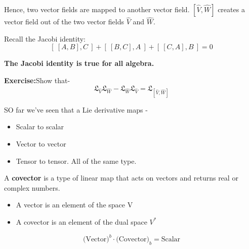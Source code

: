 \documentclass[14pt]{article} %
\begin{document}
Hence, two vector fields are mapped to another vector field. 
$[ \hat{V}, \hat{W}]$ creates a vector field out of the two vector fields $\hat{V}$ and $\hat{W}$.
\begin{tcolorbox}[proofbox, title=Note:]
Recall the Jacobi identity:
\[
\left[~ [ A, B], C~ \right] + \left[ ~[ B, C], A~ \right] + \left[~[ C, A ], B~ \right] = 0
\]
\begin{center}
    \textbf{The Jacobi identity is true for all algebra.}
\end{center}
\end{tcolorbox}
\begin{framed}
\noindent
\textbf{Exercise:}\quad Show that-
\[
\mathfrak{L}_{\hat{V}} \mathfrak{L}_{\hat{W}} - \mathfrak{L}_{\hat{W}} \mathfrak{L}_{\hat{V}} = \mathfrak{L}_{[\hat{V},\hat{W}]}
\]
\end{framed}
SO far we've seen that a Lie derivative maps -
\begin{itemize}
    \item Scalar to scalar
    \item Vector to vector
    \item Tensor to tensor. All of the same type.
\end{itemize}
\begin{tcolorbox}[proofbox, title=Covector]
A \textbf{covector} is a type of linear map that acts on vectors and returns real or complex numbers.
\begin{itemize}
    \item A vector is an element of the space V
    \item A covector is an element of the dual space $V^*$
\end{itemize}
\[
\text{(Vector)}^b \cdot \text{(Covector)}_b = \text{Scalar}
\]
\end{tcolorbox}
\end{document}
